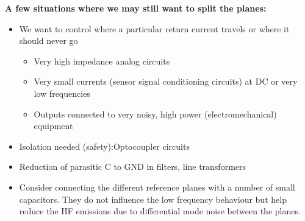 		\textbf{A few situations where we may still want to split the planes:}
		\begin{itemize}
			\item We want to control where a particular return current travels or where it should never go
			\begin{itemize}
				\item Very high impedance analog circuits
				\item Very small currents (sensor signal conditioning circuits) at DC or very low frequencies
				\item Outputs connected to very noisy, high power (electromechanical) equipment
			\end{itemize}
			\item Isolation needed (safety):Optocoupler circuits
			\item Reduction of parasitic C to GND in filters, line transformers
			\item Consider connecting the different reference planes with a number of small capacitors. They do not influence the low frequency behaviour but help reduce the HF emissions due to differential mode noise between the planes. 
		\end{itemize}
		
